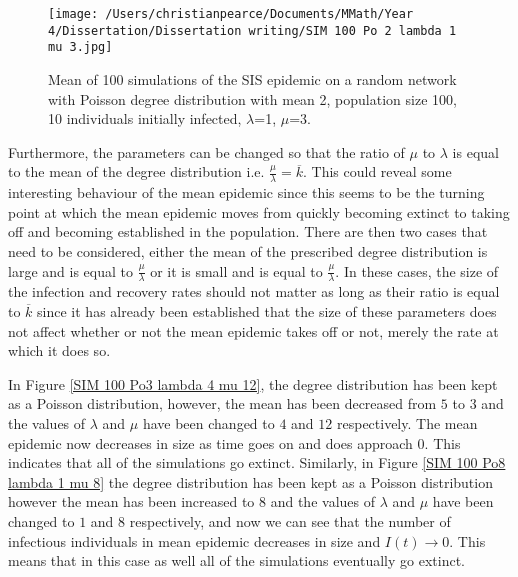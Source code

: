 \documentclass{uonmathsreport}
\begin{document}
\begin{figure}
\begin{center}
\texttt{[image: /Users/christianpearce/Documents/MMath/Year 4/Dissertation/Dissertation writing/SIM 100 Po 2 lambda 1 mu 3.jpg]}
\end{center}
\caption{Mean of 100 simulations of the SIS epidemic on a random network with Poisson degree distribution with mean 2, population size 100, 10 individuals initially infected, $\lambda$=1, $\mu$=3.}
\label{SIM 100 Po2 lambda 1 mu 3}
\end{figure}

Furthermore, the parameters can be changed so that the ratio of $\mu$ to $\lambda$ is equal to the mean of the degree distribution i.e. $\frac{\mu}{\lambda}=\overline{k}$. This could reveal some interesting behaviour of the mean epidemic since this seems to be the turning point at which the mean epidemic moves from quickly becoming extinct to taking off and becoming established in the population. There are then two cases that need to be considered, either the mean of the prescribed degree distribution is large and is equal to $\frac{\mu}{\lambda}$ or it is small and is equal to $\frac{\mu}{\lambda}$. In these cases, the size of the infection and recovery rates should not matter as long as their ratio is equal to $\overline{k}$ since it has already been established that the size of these parameters does not affect whether or not the mean epidemic takes off or not, merely the rate at which it does so.

In Figure \ref{SIM 100 Po3 lambda 4 mu 12}, the degree distribution has been kept as a Poisson distribution, however, the mean has been decreased from $5$ to $3$ and the values of $\lambda$ and $\mu$ have been changed to $4$ and $12$ respectively. The mean epidemic now decreases in size as time goes on and does approach $0$. This indicates that all of the simulations go extinct. Similarly, in Figure \ref{SIM 100 Po8 lambda 1 mu 8} the degree distribution has been kept as a Poisson distribution however the mean has been increased to $8$ and the values of $\lambda$ and $\mu$ have been changed to $1$ and $8$ respectively, and now we can see that the number of infectious individuals in mean epidemic decreases in size and $I(t) \rightarrow 0$. This means that in this case as well all of the simulations eventually go extinct.
\end{document}
